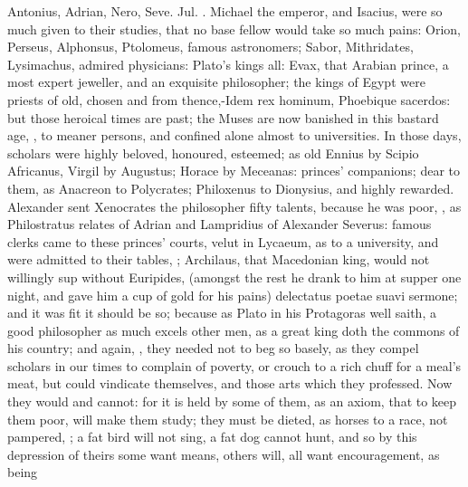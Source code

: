 {Antonius, Adrian, Nero, Seve. Jul. \etc{}. Michael the emperor,
and Isacius, were so much given to their studies, that no base fellow
would take so much pains: Orion, Perseus, Alphonsus, Ptolomeus, famous
astronomers; Sabor, Mithridates, Lysimachus, admired physicians:
Plato's kings all: Evax, that Arabian prince, a most expert jeweller,
and an exquisite philosopher; the kings of Egypt were priests of old,
chosen and from thence,-Idem rex hominum, Phoebique sacerdos: but those
heroical times are past; the Muses are now banished in this bastard
age, , to meaner persons, and confined alone almost
to universities. In those days, scholars were highly beloved,
honoured, esteemed; as old Ennius by Scipio Africanus, Virgil by
Augustus; Horace by Meceanas: princes' companions; dear to them, as
Anacreon to Polycrates; Philoxenus to Dionysius, and highly rewarded.
Alexander sent Xenocrates the philosopher fifty talents, because he was
poor, , as Philostratus relates of Adrian and Lampridius of Alexander
Severus: famous clerks came to these princes' courts, velut in Lycaeum,
as to a university, and were admitted to their tables, ; Archilaus, that Macedonian king, would not
willingly sup without Euripides, (amongst the rest he drank to him at
supper one night, and gave him a cup of gold for his pains) delectatus
poetae suavi sermone; and it was fit it should be so; because as
Plato in his Protagoras well saith, a good philosopher as much
excels other men, as a great king doth the commons of his country; and
again, , they
needed not to beg so basely, as they compel scholars in our times
to complain of poverty, or crouch to a rich chuff for a meal's meat,
but could vindicate themselves, and those arts which they professed.
Now they would and cannot: for it is held by some of them, as an axiom,
that to keep them poor, will make them study; they must be dieted, as
horses to a race, not pampered, ; a fat bird will not sing, a
fat dog cannot hunt, and so by this depression of theirs some
want means, others will, all want encouragement, as being
}
